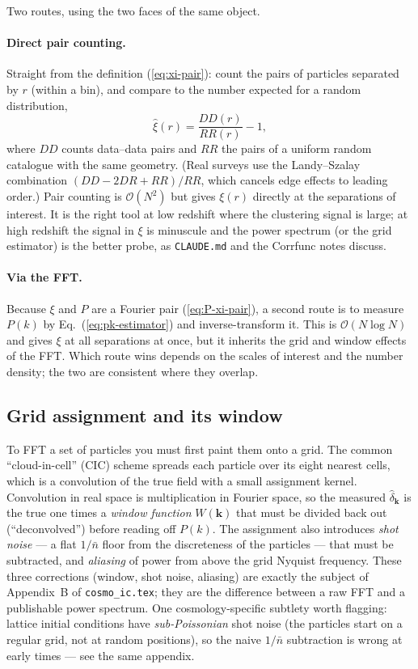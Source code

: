 \documentclass[12pt]{article}
\newcommand{\bk}{\mathbf{k}}
\newcommand{\code}[1]{\texttt{#1}}
\begin{document}
Two routes, using the two faces of the same object.

\paragraph{Direct pair counting.}  Straight from the definition
(\ref{eq:xi-pair}): count the pairs of particles separated by $r$
(within a bin), and compare to the number expected for a random
distribution,
\begin{equation}
  \hat\xi(r) = \frac{DD(r)}{RR(r)} - 1,
\end{equation}
where $DD$ counts data--data pairs and $RR$ the pairs of a uniform random
catalogue with the same geometry.  (Real surveys use the
Landy--Szalay combination $(DD - 2DR + RR)/RR$, which cancels
edge effects to leading order.)  Pair counting is $\mathcal O(N^2)$ but
gives $\xi(r)$ directly at the separations of interest.  It is the right
tool at low redshift where the clustering signal is large; at high
redshift the signal in $\xi$ is minuscule and the power spectrum (or the
grid estimator) is the better probe, as \code{CLAUDE.md} and the Corrfunc
notes discuss.

\paragraph{Via the FFT.}  Because $\xi$ and $P$ are a Fourier pair
(\ref{eq:P-xi-pair}), a second route is to measure $P(k)$ by
Eq.~(\ref{eq:pk-estimator}) and inverse-transform it.  This is $\mathcal
O(N\log N)$ and gives $\xi$ at all separations at once, but it inherits
the grid and window effects of the FFT.  Which route wins depends on the
scales of interest and the number density; the two are consistent where
they overlap.

\subsection{Grid assignment and its window}
\label{sec:cic}

To FFT a set of particles you must first paint them onto a grid.  The
common ``cloud-in-cell'' (CIC) scheme spreads each particle over its
eight nearest cells, which is a convolution of the true field with a
small assignment kernel.  Convolution in real space is multiplication in
Fourier space, so the measured $\hat\delta_\bk$ is the true one times a
\emph{window function} $W(\bk)$ that must be divided back out
(``deconvolved'') before reading off $P(k)$.  The assignment also
introduces \emph{shot noise} --- a flat $1/\bar n$ floor from the
discreteness of the particles --- that must be subtracted, and
\emph{aliasing} of power from above the grid Nyquist frequency.  These
three corrections (window, shot noise, aliasing) are exactly the subject
of Appendix~B of \code{cosmo\_ic.tex}; they are the difference between a
raw FFT and a publishable power spectrum.  One cosmology-specific subtlety
worth flagging: lattice initial conditions have \emph{sub-Poissonian}
shot noise (the particles start on a regular grid, not at random
positions), so the naive $1/\bar n$ subtraction is wrong at early times
--- see the same appendix.
\end{document}
